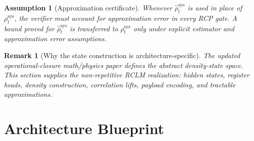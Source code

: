 \documentclass[11pt,a4paper]{article}
\newtheorem{assumption}[theorem]{Assumption}
\newtheorem{remark}[theorem]{Remark}
\newcommand{\sys}{\mathrm{sys}}
\begin{document}
\begin{assumption}[Approximation certificate]
Whenever \(\widehat\rho_t^{\sys}\) is used in place of \(\rho_t^{\sys}\), the verifier must account for approximation error in every RCP gate.  A bound proved for \(\widehat\rho_t^{\sys}\) is transferred to \(\rho_t^{\sys}\) only under explicit estimator and approximation error assumptions.
\end{assumption}

\begin{remark}[Why the state construction is architecture-specific]
The updated operational-closure math/physics paper defines the abstract density-state space.  This section supplies the non-repetitive RCLM realization: hidden states, register heads, density construction, correlation lifts, payload encoding, and tractable approximations.
\end{remark}

\section{Architecture Blueprint}
\end{document}
